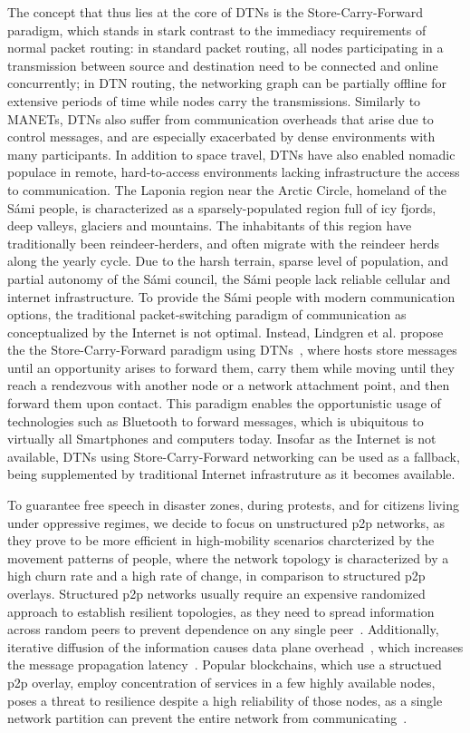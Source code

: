 The concept that thus lies at the core of DTNs is the Store-Carry-Forward paradigm, which stands in stark contrast to the immediacy requirements of normal packet routing: in standard packet routing, all nodes participating in a transmission between source and destination need to be connected and online concurrently; in DTN routing, the networking graph can be partially offline for extensive periods of time while nodes carry the transmissions.
Similarly to MANETs, DTNs also suffer from communication overheads that arise due to control messages, and are especially exacerbated by dense environments with many participants.
In addition to space travel, DTNs have also enabled nomadic populace in remote, hard-to-access environments lacking infrastructure the access to communication. The Laponia region near the Arctic Circle, homeland of the Sámi people, is characterized as a sparsely-populated region full of icy fjords, deep valleys, glaciers and mountains.
The inhabitants of this region have traditionally been reindeer-herders, and often migrate with the reindeer herds along the yearly cycle. Due to the harsh terrain, sparse level of population, and partial autonomy of the Sámi council, the Sámi people lack reliable cellular and internet infrastructure. To provide the Sámi people with modern communication options, the traditional packet-switching paradigm of communication as conceptualized by the Internet is not optimal.
Instead, Lindgren et al. propose the the Store-Carry-Forward paradigm using DTNs~\cite{Lindgren2007}, where hosts store messages until an opportunity arises to forward them, carry them while moving until they reach a rendezvous with another node or a network attachment point, and then forward them upon contact. This paradigm enables the opportunistic usage of technologies such as Bluetooth to forward messages, which is ubiquitous to virtually all Smartphones and computers today.
Insofar as the Internet is not available, DTNs using Store-Carry-Forward networking can be used as a fallback, being supplemented by traditional Internet infrastruture as it becomes available.

To guarantee free speech in disaster zones, during protests, and for citizens living under oppressive regimes, we decide to focus on unstructured p2p networks, as they prove to be more efficient in high-mobility scenarios charcterized by the movement patterns of people, where the network topology is characterized by a high churn rate and a high rate of change, in comparison to structured p2p overlays.
Structured p2p networks usually require an expensive randomized approach to establish resilient topologies, as they need to spread information across random peers to prevent dependence on any single peer~\cite{guzman22, guzman25, kademlia}. Additionally, iterative diffusion of the information causes data plane overhead~\cite{guzman25}, which increases the message propagation latency~\cite{guzman22, guzman23}.
Popular blockchains, which use a structued p2p overlay, employ concentration of services in a few highly available nodes, poses a threat to resilience despite a high reliability of those nodes, as a single network partition can prevent the entire network from communicating~\cite{guzman24}.

